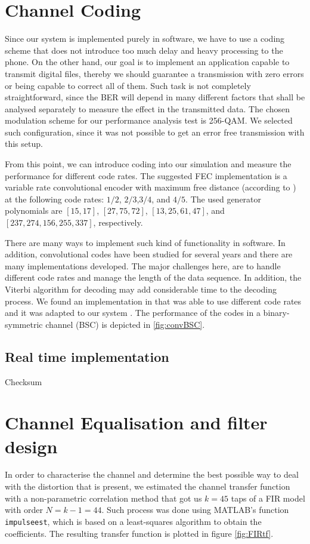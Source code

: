 \documentclass[12pt,a4paper,openright]{report}
\begin{document}
\section{Channel Coding}
\label{sec:ChanCodTests}
Since our system is implemented purely in software, we have to use a coding scheme that does not introduce too much delay and heavy processing to the phone. On the other hand, our goal is to implement an application capable to transmit digital files, thereby we should guarantee a transmission with zero errors or being capable to correct all of them. Such task is not completely straightforward, since the BER will depend in many different factors that shall be analysed separately to measure the effect in the transmitted data. 
The chosen modulation scheme for our performance analysis test is 256-QAM. We selected such configuration, since it was not possible to get an error free transmission with this setup. 

From this point, we can introduce coding into our simulation and measure the performance for different code rates. The suggested FEC implementation is a variable rate convolutional encoder with maximum free distance (according to \cite{Proakis}) at the following code rates: $1/2$, $2/3$,$3/4$, and $4/5$. The used generator polynomials are $[15,17]$, $[27,75,72]$, $[13,25,61,47]$, and $[237,274,156,255,337]$, respectively. 

There are many ways to implement such kind of functionality in software. In addition, convolutional codes have been studied for several years and there are many implementations developed. The major challenges here, are to  handle different code rates and manage the length of the data sequence. In addition, the Viterbi algorithm for decoding may add considerable time to the decoding process. We found an implementation in \cite{concodeSource} that was able to use different code rates and it was adapted to our system . The performance of the codes in a binary-symmetric channel (BSC) is depicted in \ref{fig:convBSC}.


\subsection{Real time implementation}
\label{subsec:Checksum}
Checksum





\section{Channel Equalisation and filter design}
\label{sec:EQdesign}
In order to characterise the channel and determine the best possible way to deal with the distortion that is present, we estimated the channel transfer function with a non-parametric correlation method that got us $k=45$ taps of a FIR model with order $N=k-1=44$. Such process was done using MATLAB's function \texttt{impulseest}, which is based on a least-squares algorithm to obtain the coefficients. The resulting transfer function is plotted in figure \ref{fig:FIRtf}. 
 
\end{document}
